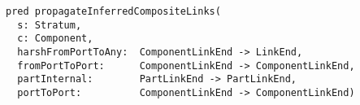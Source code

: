 \lstset{frame=tb, aboveskip=12pt, belowskip=-3pt, breaklines=true, basicstyle=\small\ttfamily, tabsize=2, mathescape=true}
\begin{lstlisting}[caption={bb\_port\_inference.als, lines 215-221}, label=alloy:propagatelinks, captionpos=b]
pred propagateInferredCompositeLinks(
  s: Stratum,
  c: Component,  
  harshFromPortToAny:  ComponentLinkEnd -> LinkEnd,
  fromPortToPort:      ComponentLinkEnd -> ComponentLinkEnd,
  partInternal:        PartLinkEnd -> PartLinkEnd,
  portToPort:          ComponentLinkEnd -> ComponentLinkEnd)
\end{lstlisting}
